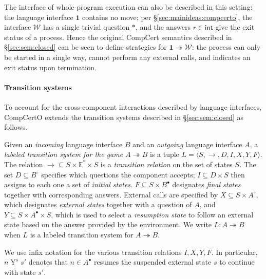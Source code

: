 \documentclass[sigplan,screen,review]{acmart}
\newcommand{\kw}[1]{\ensuremath{ \mathsf{#1} }}
\newcommand{\que}{\circ}
\newcommand{\ans}{\bullet}
\begin{document}
The interface of whole-program execution
can also be described in this setting:
the language interface $\mathbf{1}$ contains no move;
per \S\ref{sec:mainideas:compcerto},
the interface $\mathcal{W}$ has a single trivial question $*$,
and the answers $r \in \kw{int}$
give the exit status of a process.
Hence the original CompCert semantics described in
\S\ref{sec:sem:closed}
can be seen to define strategies for
$\mathbf{1} \twoheadrightarrow \mathcal{W}$:
the process can only be started in a single way,
cannot perform any external calls,
and indicates an exit status upon termination.


\paragraph{Transition systems} %

To account for the cross-component interactions
described by language interfaces,
CompCertO extends
the transition systems described in \S\ref{sec:sem:closed}
as follows.

\begin{definition} \label{def:lts}
Given an \emph{incoming} language interface $B$
and an \emph{outgoing} language interface $A$,
a \emph{labeled transition system for the game $A \twoheadrightarrow B$}
is a tuple $L = \langle S, \rightarrow, D, I, X, Y, F \rangle$.
The relation
${\rightarrow} \subseteq S \times \mathbb{E}^* \times S$ is
a \emph{transition relation} on the set of states $S$.
The set $D \subseteq B^\que$ specifies which
questions the component accepts;
$I \subseteq D \times S$ then
assigns to each one a set of \emph{initial states}.
$F \subseteq S \times B^\ans$
designates \emph{final states} together with corresponding answers.
External calls are specified by
$X \subseteq S \times A^\que$,
which designates \emph{external states} together with
a question of $A$, and
$Y \subseteq S \times A^\ans \times S$,
which is used to select a \emph{resumption state}
to follow an external state
based on the answer provided by the environment.
We write $L : A \twoheadrightarrow B$ when
$L$ is a labeled transition system for $A \twoheadrightarrow B$.
\end{definition}

We use infix notation for the various transition relations
$I, X, Y, F$.
In particular, $n \mathrel{Y}^s s'$
denotes that $n \in A^\ans$
resumes the suspended external state $s$
to continue with state $s'$.
\end{document}

